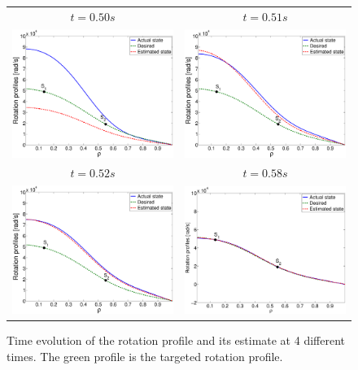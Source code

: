 \documentclass[12pt]{iopart}
\begin{document}
\begin{figure}
\begin{tabular}{cc}
$t = 0.50 s$  & $t = 0.51 s$ \\
\includegraphics[width=0.5\linewidth]{imene_figs/Goum18l} & %
\includegraphics[width= 0.5\linewidth]{imene_figs/Goum18ll} \\ %
$t = 0.52 s$  & $t = 0.58 s$ \\
\includegraphics[width=0.5\linewidth]{imene_figs/Goum18lll} &%
\includegraphics[width=0.5\linewidth]{imene_figs/Goum18llll} %
\end{tabular}
\caption{Time evolution of the rotation profile and its estimate at 4 different times. The green profile is the targeted rotation profile. }
\label{fig:rot18}
\end{figure}
\end{document}
